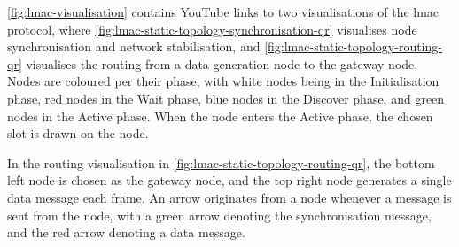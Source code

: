 \autoref{fig:lmac-visualisation} contains YouTube links to two visualisations of the \gls{lmac} protocol,
where \autoref{fig:lmac-static-topology-synchronisation-qr} visualises node synchronisation and network
stabilisation, and \autoref{fig:lmac-static-topology-routing-qr} visualises the routing from a data generation
node to the gateway node. Nodes are coloured per their phase, with white nodes being in the Initialisation
phase, red nodes in the Wait phase, blue nodes in the Discover phase, and green nodes in the Active phase.
When the node enters the Active phase, the chosen slot is drawn on the node. \medbreak

In the routing visualisation in \autoref{fig:lmac-static-topology-routing-qr}, the bottom left node is chosen
as the gateway node, and the top right node generates a single data message each frame. An arrow originates
from a node whenever a message is sent from the node, with a green arrow denoting the synchronisation message,
and the red arrow denoting a data message. \medbreak







